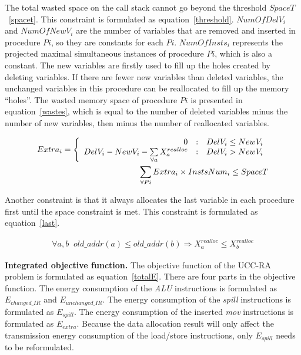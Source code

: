 The total wasted space on the call stack cannot go beyond the threshold $SpaceT$~\ref{spacet}.
This constraint is formulated as equation~\ref{threshold}.
$NumOfDelV_i$ and $NumOfNewV_i$ are the number of variables that are removed and inserted
in procedure $Pi$, so they are constants for each $Pi$.
$NumOfInsts_i$ represents the projected maximal simultaneous instances of procedure $Pi$,
which is also a constant. 
The new variables are firstly used to fill up the holes created by deleting variables.
If there are fewer new variables than deleted variables, the unchanged variables
in this procedure can be reallocated to fill up the memory ``holes''.
The wasted memory space of procedure $Pi$ is presented in equation~\ref{wastes},
which is equal to the number of deleted variables minus the number of new variables,
then minus the number of reallocated variables.

\begin{figure}[ht]
\begin{small}
\begin{eqnarray}
Extra_i = \left\{\begin{array}{r@{\quad:\quad}l}
0  & \mbox{$DelV_i \leq NewV_i$}\\
DelV_i - NewV_i -{\sum\limits_{\forall a}{X_{a}^{realloc}}}&  \mbox{$DelV_i > NewV_i$}
\end{array}\right.  \label{wastes} \\
\sum_{\forall Pi}{Extra_i\times InstsNum_i } \leq SpaceT\label{threshold}
\end{eqnarray}
\end{small}
\end{figure}


Another constraint is that it always allocates the last variable in each procedure first until the
space constraint is met. This constraint is formulated as equation~\ref{last}.
\begin{figure}[ht]
\begin{small}
\begin{eqnarray}
\forall{a,b} \;\; old\_addr(a) \leq old\_addr(b)\Rightarrow  X_{a}^{realloc} \leq X_{b}^{realloc}\label{last}
\end{eqnarray}
\end{small}
\end{figure}



\textbf{Integrated objective function.}
The objective function of the UCC-RA problem is formulated as equation~\ref{totalE}.
There are four parts in the objective function.
The energy consumption of the {\it ALU} instructions is formulated as $E_{changed\_IR}$ and $E_{unchanged\_IR}$.
The energy consumption of the {\it spill} instructions is formulated as $E_{spill}$.
The energy consumption of the inserted {\it mov} instructions is formulated as $E_{extra}$.
Because the data allocation result will only affect the transmission energy consumption of the load/store
instructions, only $E_{spill}$ needs to be reformulated.

